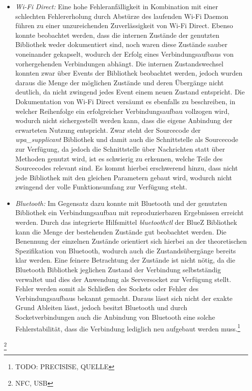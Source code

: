 		\begin{itemize}
		\item {\it Wi-Fi Direct:} Eine hohe Fehleranfälligkeit in Kombination mit einer schlechten Fehlererholung durch Abstürze des laufenden Wi-Fi Daemon führen zu einer unzureichenden Zuverlässigkeit von Wi-Fi Direct. Ebenso konnte beobachtet werden, dass die internen Zustände der genutzten Bibliothek weder dokumentiert sind, noch waren diese Zustände sauber voneinander gekapselt, wodurch der Erfolg eines Verbindungsaufbaus von vorhergehenden Verbindungen abhängt. Die internen Zustandswechsel konnten zwar über Events der Bibliothek beobachtet werden, jedoch wurden daraus die Menge der möglichen Zustände und deren Übergänge nicht deutlich, da nicht zwingend jedes Event einem neuen Zustand entspricht. Die Dokumentation von Wi-Fi Direct versäumt es ebenfalls zu beschreiben, in welcher Reihenfolge ein erfolgreicher Verbindungsaufbau vollzogen wird, wodurch nicht sichergestellt werden kann, dass die eigene Anbindung der erwarteten Nutzung entspricht.
		Zwar steht der Sourcecode der {\it wpa\_supplicant} Bibliothek und damit auch die Schnittstelle als Sourcecode zur Verfügung, da jedoch die Schnittstelle über Nachrichten statt über Methoden genutzt wird, ist es schwierig zu erkennen, welche Teile des Sourcecodes relevant sind. Es kommt hierbei erschwerend hinzu, dass nicht jede Bibliothek mit den gleichen Parametern gebaut wird, wodurch nicht zwingend der volle Funktionsumfang zur Verfügung steht.
		
		\item {\it Bluetooth:} Im Gegensatz dazu konnte mit Bluetooth und der genutzten Bibliothek ein Verbindungsaufbau mit reproduzierbaren Ergebnissen erreicht werden. Durch das integrierte Hilfsmittel {\it bluetoothctl} der BlueZ Bibliothek kann die Menge der bestehenden Zustände gut beobachtet werden. Die Benennung der einzelnen Zustände orientiert sich hierbei an der theoretischen Spezifikation von Bluetooth, wodurch auch die Zustandsübergänge bereits klar werden. Eine feinere Betrachtung der Zustände ist nicht nötig, da die Bluetooth Bibliothek jeglichen Zustand der Verbindung selbstständig verwaltet und dies der Anwendung als Serversocket zur Verfügung stellt. Fehler werden somit als Schließen des Sockets oder Fehler des Verbindungsaufbaus bekannt gemacht. Daraus lässt sich nicht der exakte Grund Ableiten lässt, jedoch besitzt Bluetooth und durch Socketverbindungen auch die Anbindung von Bluetooth eine solche Fehlerstabilität, dass die Verbindung lediglich neu aufgebaut werden muss.\footnote{TODO: PRECISISE, QUELLE}
		
		\end{itemize}
		\footnote{NFC, USB}
